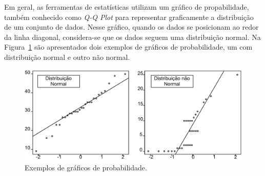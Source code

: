 Em geral, as ferramentas de estatísticas utilizam um gráfico de propabilidade, também conhecido como \textit{Q-Q Plot} para representar graficamente a distribuição de um conjunto de dados. Nesse gráfico, quando os dados se posicionam ao redor da linha diagonal, considera-se que os dados seguem uma distribuição normal. Na Figura~\ref{fig:qq_plot_exemple} são apresentados dois exemplos de gráficos de probabilidade, um com distribuição normal e outro não normal.

\begin{figure}[h]
	\centering
	\caption{Exemplos de gráficos de probabilidade.}
	\label{fig:qq_plot_exemple}
	\includegraphics[scale=0.6]{images/qq_plot_exemplo}
	\fautor
\end{figure}